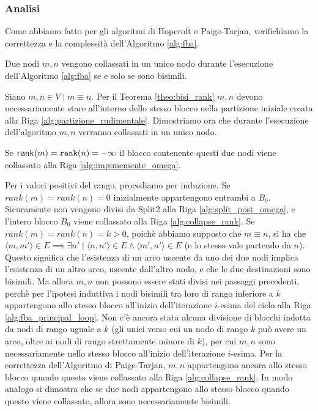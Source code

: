 \subsubsection{Analisi}
Come abbiamo fatto per gli algoritmi di Hopcroft e Paige-Tarjan, verifichiamo la correttezza e la complessità dell'Algoritmo \ref{alg:fba}.
\begin{theorem}
    Due nodi $m,n$ vengono collassati in un unico nodo durante l'esecuzione dell'Algoritmo \ref{alg:fba} se e solo se sono bisimili.
\end{theorem}
\begin{proof2}
    Siano $m,n \in V \mid m \equiv n$. Per il Teorema \ref{theo:bisi_rank} $m,n$ devono necessariamente stare all'interno dello stesso blocco nella partizione iniziale creata alla Riga \ref{alg:partizione_rudimentale}. Dimostriamo ora che durante l'esecuzione dell'algoritmo $m,n$ verranno collassati in un unico nodo.

    Se \texttt{rank}$(m) = \verb|rank|(n) = -\infty$ il blocco contenente questi due nodi viene collassato alla Riga \ref{alg:impunemente_omega}.

    Per i valori positivi del rango, procediamo per induzione. Se $rank(m) = rank(n) = 0$ inizialmente appartengono entrambi a $B_0$. Sicuramente non vengono divisi da Split2 alla Riga \ref{alg:split_post_omega}, e l'intero blocco $B_0$ viene collassato alla Riga \ref{alg:collapse_rank}. Se $rank(m) = rank(n) = k > 0$, poichè abbiamo supposto che $m \equiv n$, si ha che $\langle m, m' \rangle \in E \implies \exists n' \mid \langle n, n' \rangle \in E \land \langle m', n' \rangle \in E$ (e lo stesso vale partendo da $n$). Questo significa che l'esistenza di un arco uscente da uno dei due nodi implica l'esistenza di un altro arco, uscente dall'altro nodo, e che le due destinazioni sono bisimili. Ma allora $m,n$ non possono essere stati divisi nei passaggi precedenti, perchè per l'ipotesi induttiva i nodi bisimili tra loro di rango inferiore a $k$ appartengono allo stesso blocco all'inizio dell'iterazione $i$-esima del ciclo alla Riga \ref{alg:fba_principal_loop}. Non c'è ancora stata alcuna divisione di blocchi indotta da nodi di rango uguale a $k$ (gli unici verso cui un nodo di rango $k$ può avere un arco, oltre ai nodi di rango strettamente minore di $k$), per cui $m,n$ sono necessariamente nello stesso blocco all'inizio dell'iterazione $i$-esima. Per la correttezza dell'Algoritmo di Paige-Tarjan, $m,n$ appartengono ancora allo stesso blocco quando questo viene collassato alla Riga \ref{alg:collapse_rank}. In modo analogo si dimostra che se due nodi appartengono allo stesso blocco quando questo viene collassato, allora sono necessariamente bisimili.
\end{proof2}
